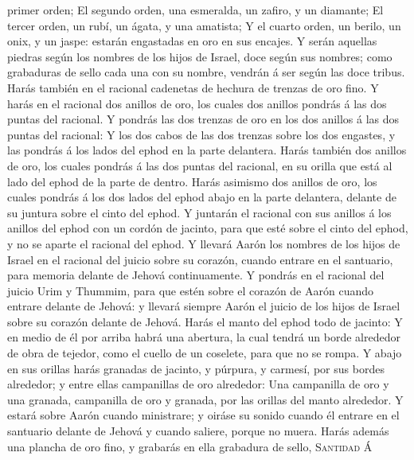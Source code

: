 primer orden;  El segundo orden, una esmeralda, un
zafiro, y un diamante;  El tercer orden, un rubí, un
ágata, y una amatista;  Y el cuarto orden, un berilo, un
onix, y un jaspe: estarán engastadas en oro en sus encajes.
 Y serán aquellas piedras según los nombres de los hijos
de Israel, doce según sus nombres; como grabaduras de sello cada una con
su nombre, vendrán á ser según las doce tribus.  Harás
también en el racional cadenetas de hechura de trenzas de oro fino.
 Y harás en el racional dos anillos de oro, los cuales
dos anillos pondrás á las dos puntas del racional.  Y
pondrás las dos trenzas de oro en los dos anillos á las dos puntas del
racional:  Y los dos cabos de las dos trenzas sobre los
dos engastes, y las pondrás á los lados del ephod en la parte delantera.
 Harás también dos anillos de oro, los cuales pondrás á
las dos puntas del racional, en su orilla que está al lado del ephod de
la parte de dentro.  Harás asimismo dos anillos de oro,
los cuales pondrás á los dos lados del ephod abajo en la parte
delantera, delante de su juntura sobre el cinto del ephod.
 Y juntarán el racional con sus anillos á los anillos del
ephod con un cordón de jacinto, para que esté sobre el cinto del ephod,
y no se aparte el racional del ephod.  Y llevará Aarón
los nombres de los hijos de Israel en el racional del juicio sobre su
corazón, cuando entrare en el santuario, para memoria delante de Jehová
continuamente.  Y pondrás en el racional del juicio Urim
y Thummim, para que estén sobre el corazón de Aarón cuando entrare
delante de Jehová: y llevará siempre Aarón el juicio de los hijos de
Israel sobre su corazón delante de Jehová.  Harás el
manto del ephod todo de jacinto:  Y en medio de él por
arriba habrá una abertura, la cual tendrá un borde alrededor de obra de
tejedor, como el cuello de un coselete, para que no se rompa.
 Y abajo en sus orillas harás granadas de jacinto, y
púrpura, y carmesí, por sus bordes alrededor; y entre ellas campanillas
de oro alrededor:  Una campanilla de oro y una granada,
campanilla de oro y granada, por las orillas del manto alrededor.
 Y estará sobre Aarón cuando ministrare; y oiráse su
sonido cuando él entrare en el santuario delante de Jehová y cuando
saliere, porque no muera.  Harás además una plancha de
oro fino, y grabarás en ella grabadura de sello, \textsc{Santidad} Á

